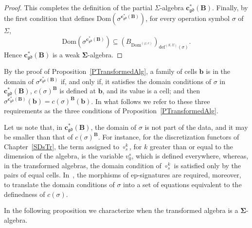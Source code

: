 \documentclass[a4paper, reqno]{amsbook}
\newcommand{\sig}[1]{\mathbf{#1}}             %
\newcommand{\Dom}{\mathrm{Dom}}
\newcommand{\gd}{\mathfrak{gd}}              %
\theoremstyle{plain}
\theoremstyle{definition}
\begin{document}
\begin{proof}
This completes the definition of the partial $\Sigma$-algebra $\mathbf{c}^{\ast}_{\gd}(\mathbf{B})$.
Finally, by the first condition that defines $\Dom(\sigma^{\mathbf{c}^{\ast}_{\gd}(\mathbf{B})})$, for every operation symbol $\sigma$ of $\Sigma$,
$$
\Dom\left(\sigma^{\mathbf{c}^{\ast}_{\gd}(\mathbf{B})}\right)\subseteq\left(B_{\Dom^{(\varphi,c)}}\right)_{\mathrm{def}^{(S,\Sigma)}(\sigma)}.
$$
Hence $\mathbf{c}^{\ast}_{\gd}(\mathbf{B})$ is a weak $\sig{\Sigma}$-algebra.
\end{proof}

By the proof of Proposition~\ref{PTransformedAlg}, a family of cells $\mathbf{b}$ is in the domain of $\sigma^{\mathbf{c}^{\ast}_{\gd}(\mathbf{B})}$ if, and only if, it satisfies the domain conditions of $\sigma$ in $\mathbf{c}^{\ast}_{\gd}(\mathbf{B})$, $c(\sigma)^{\mathbf{B}}$ is defined at $\mathbf{b}$, and its value is a cell; and then $\sigma^{\mathbf{c}^{\ast}_{\gd}(\mathbf{B})}(\mathbf{b})=c(\sigma)^{\mathbf{B}}(\mathbf{b})$.
In what follows we refer to these three requirements as the three conditions of Proposition~\ref{PTransformedAlg}.

Let us note that, in $\mathbf{c}^{\ast}_{\gd}(\mathbf{B})$, the domain of $\sigma$ is not part of the data, and it may be smaller than that of $c(\sigma)^{\mathbf{B}}$.
For instance, for the discretization functors of Chapter~\ref{SDsTr}, the term assigned to $\circ^{k}_{s}$, for $k$ greater than or equal to the dimension of the algebra, is the variable $v^{s}_{0}$, which is defined everywhere, whereas, in the transformed algebras, the domain condition of $\circ^{k}_{s}$ is satisfied only by the pairs of equal cells.
In~\cite{Reichel1987}, the morphisms of ep-signatures are required, moreover, to translate the domain conditions of $\sigma$ into a set of equations equivalent to the definedness of $c(\sigma)$.

In the following proposition we characterize when the transformed algebra is a $\sig{\Sigma}$-algebra.
\end{document}
